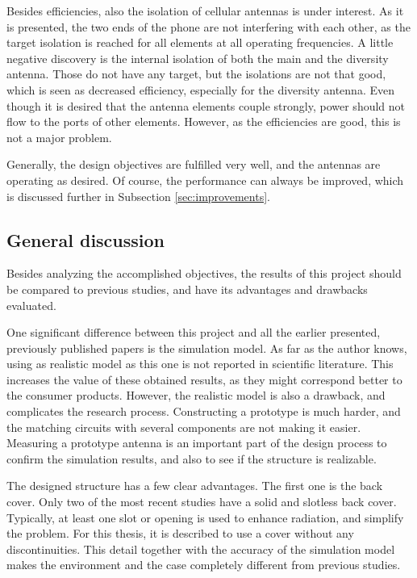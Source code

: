 Besides efficiencies, also the isolation of cellular antennas is under interest. As it is presented, the two ends of the phone are not interfering with each other, as the target isolation is reached for all elements at all operating frequencies. A little negative discovery is the internal isolation of both the main and the diversity antenna. Those do not have any target, but the isolations are not that good, which is seen as decreased efficiency, especially for the diversity antenna. Even though it is desired that the antenna elements couple strongly, power should not flow to the ports of other elements. However, as the efficiencies are good, this is not a major problem.

Generally, the design objectives are fulfilled very well, and the antennas are operating as desired. Of course, the performance can always be improved, which is discussed further in Subsection \ref{sec:improvements}.


\subsection{General discussion}
\label{sec:general_discussion}
Besides analyzing the accomplished objectives, the results of this project should be compared to previous studies, and have its advantages and drawbacks evaluated.

One significant difference between this project and all the earlier presented, previously published papers is the simulation model. As far as the author knows, using as realistic model as this one is not reported in scientific literature. This increases the value of these obtained results, as they might correspond better to the consumer products. However, the realistic model is also a drawback, and complicates the research process. Constructing a prototype is much harder, and the matching circuits with several components are not making it easier. Measuring a prototype antenna is an important part of the design process to confirm the simulation results, and also to see if the structure is realizable.

The designed structure has a few clear advantages. The first one is the back cover. Only two of the most recent studies have a solid and slotless back cover. Typically, at least one slot or opening is used to enhance radiation, and simplify the problem. For this thesis, it is described to use a cover without any discontinuities. This detail together with the accuracy of the simulation model makes the environment and the case completely different from previous studies.

